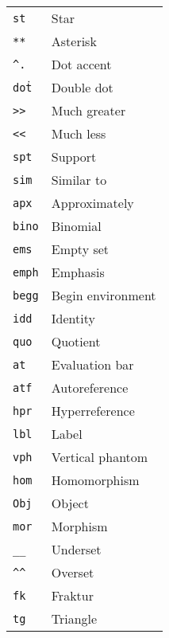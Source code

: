 \documentclass{article}
\newcommand{\snippet}[1]{\textcolor{titlebg}{\texttt{#1}}}
\begin{document}
\begin{center}
\begin{tabularx}{\textwidth}{lY}
\snippet{st} & Star \\
\snippet{**} & Asterisk \\
\snippet{\texttt{\textasciicircum}.} & Dot accent \\
\snippet{dot\.} & Double dot \\
\snippet{>>} & Much greater \\
\snippet{<<} & Much less \\
\snippet{spt} & Support \\
\snippet{sim} & Similar to \\
\snippet{apx} & Approximately \\
\snippet{bino} & Binomial \\
\snippet{ems} & Empty set \\
\snippet{emph} & Emphasis \\
\snippet{begg} & Begin environment \\
\snippet{idd} & Identity \\
\snippet{quo} & Quotient \\
\snippet{at} & Evaluation bar \\
\snippet{atf} & Autoreference \\
\snippet{hpr} & Hyperreference \\
\snippet{lbl} & Label \\
\snippet{vph} & Vertical phantom \\
\snippet{hom} & Homomorphism \\
\snippet{Obj} & Object \\
\snippet{mor} & Morphism \\
\snippet{\_\_} & Underset \\
\snippet{\texttt{\textasciicircum\textasciicircum}
} & Overset \\
\snippet{fk} & Fraktur \\
\snippet{tg} & Triangle \\
\end{tabularx}
\end{center}
\end{document}
